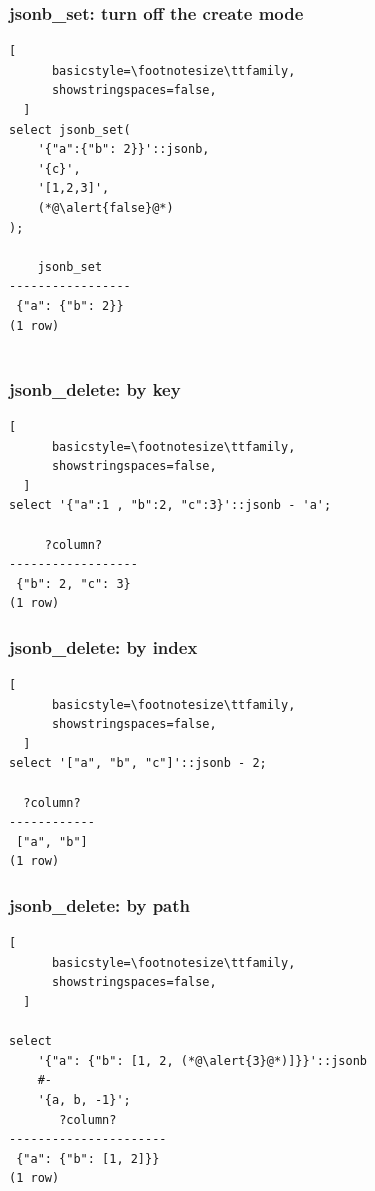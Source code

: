 \documentclass[14pt, compress, aspectratio=169]{beamer}
\begin{document}
\begin{frame}[fragile]
  \frametitle{jsonb\_set: turn off the create mode}

  \begin{lstlisting}[
      basicstyle=\footnotesize\ttfamily,
      showstringspaces=false,
  ]
select jsonb_set(
    '{"a":{"b": 2}}'::jsonb,
    '{c}',
    '[1,2,3]',
    (*@\alert{false}@*)
);

    jsonb_set    
-----------------
 {"a": {"b": 2}}
(1 row)
 
  \end{lstlisting}

\end{frame}

\begin{frame}[fragile]
  \frametitle{jsonb\_delete: by key}

  \begin{lstlisting}[
      basicstyle=\footnotesize\ttfamily,
      showstringspaces=false,
  ]
select '{"a":1 , "b":2, "c":3}'::jsonb - 'a';

     ?column?     
------------------
 {"b": 2, "c": 3}
(1 row)

  \end{lstlisting}
\end{frame}

\begin{frame}[fragile]
  \frametitle{jsonb\_delete: by index}

  \begin{lstlisting}[
      basicstyle=\footnotesize\ttfamily,
      showstringspaces=false,
  ]
select '["a", "b", "c"]'::jsonb - 2;

  ?column?  
------------
 ["a", "b"]
(1 row)

  \end{lstlisting}
\end{frame}

\begin{frame}[fragile]
  \frametitle{jsonb\_delete: by path}

  \begin{lstlisting}[
      basicstyle=\footnotesize\ttfamily,
      showstringspaces=false,
  ]

select 
    '{"a": {"b": [1, 2, (*@\alert{3}@*)]}}'::jsonb
    #-
    '{a, b, -1}';
       ?column?       
----------------------
 {"a": {"b": [1, 2]}}
(1 row)

  \end{lstlisting}
\end{frame}
\end{document}
